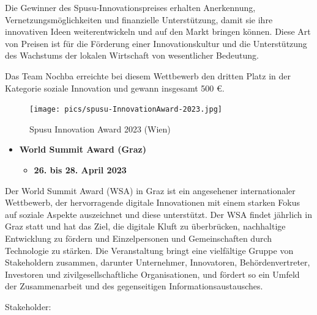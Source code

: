 Die Gewinner des Spusu-Innovationspreises erhalten Anerkennung, Vernetzungsmöglichkeiten und finanzielle Unterstützung, damit sie ihre innovativen Ideen weiterentwickeln und auf den Markt bringen können. Diese Art von Preisen ist für die Förderung einer Innovationskultur und die Unterstützung des Wachstums der lokalen Wirtschaft von wesentlicher Bedeutung.

Das Team Nochba erreichte bei diesem Wettbewerb den dritten Platz in der Kategorie soziale Innovation und gewann insgesamt 500 €.

\begin{figure}[H]
    \centering
    \texttt{[image: pics/spusu-InnovationAward-2023.jpg]}
    \caption{Spusu Innovation Award 2023 (Wien)}
    \label{fig:spusu-InnovationAward-2023}
\end{figure}

\begin{itemize}
    \item \textbf{World Summit Award (Graz)}
          \begin{itemize}
              \item \textbf{26. bis 28. April 2023}
          \end{itemize}
\end{itemize}

Der World Summit Award (WSA) in Graz ist ein angesehener internationaler Wettbewerb, der hervorragende digitale Innovationen mit einem starken Fokus auf soziale Aspekte auszeichnet und diese unterstützt. Der WSA findet jährlich in Graz statt und hat das Ziel, die digitale Kluft zu überbrücken, nachhaltige Entwicklung zu fördern und Einzelpersonen und Gemeinschaften durch Technologie zu stärken. Die Veranstaltung bringt eine vielfältige Gruppe von Stakeholdern zusammen, darunter Unternehmer, Innovatoren, Behördenvertreter, Investoren und zivilgesellschaftliche Organisationen, und fördert so ein Umfeld der Zusammenarbeit und des gegenseitigen Informationsaustausches.

Stakeholder:

